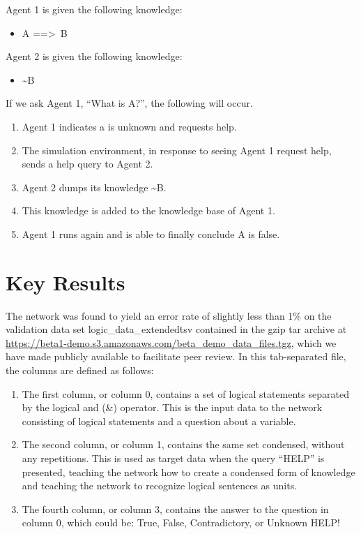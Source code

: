 \documentclass{article}
\begin{document}
Agent 1 is given the following knowledge:

\begin{itemize}
	\item A ==\textgreater \, B
\end{itemize}

Agent 2 is given the following knowledge:

\begin{itemize}
	\item \textasciitilde B
\end{itemize}

If we ask Agent 1, ``What is A?'', the following will occur.

\begin{enumerate}
	\item Agent 1 indicates a is unknown and requests help.
	\item The simulation environment, in response to seeing Agent 1 request help, sends a help query to Agent 2.
	\item Agent 2 dumps its knowledge \textasciitilde B.
	\item This knowledge is added to the knowledge base of Agent 1.
	\item Agent 1 runs again and is able to finally conclude A is false.
\end{enumerate}

\section{Key Results}

The network was found to yield an error rate of slightly less than 1\% on the validation data set logic\_data\_extended\.tsv contained in the gzip tar archive at \url{https://beta1-demo.s3.amazonaws.com/beta_demo_data_files.tgz}, which we have made publicly available to facilitate peer review. In this tab-separated file, the columns are defined as follows:

\begin{enumerate}
	\item The first column, or column 0, contains a set of logical statements separated by the logical and (\&) operator. This is the input data to the network consisting of logical statements and a question about a variable.
	\item The second column, or column 1, contains the same set condensed, without any repetitions. This is used as target data when the query “HELP” is presented, teaching the network how to create a condensed form of knowledge and teaching the network to recognize logical sentences as units.
	\item The fourth column, or column 3, contains the answer to the question in column 0, which could be: True, False, Contradictory, or Unknown HELP!
\end{enumerate}
\end{document}
